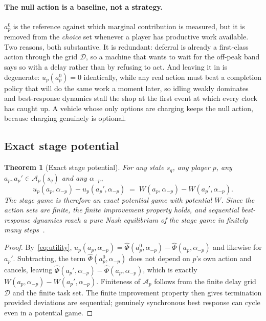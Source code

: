 \documentclass[preprint, 3p, review, 12pt]{elsarticle}
\newtheorem{theorem}{Theorem}
\theoremstyle{definition}
\begin{document}
\paragraph{The null action is a baseline, not a strategy.}
$a_p^{0}$ is the reference against which marginal contribution is measured, but it is removed
from the \emph{choice} set whenever a player has productive work available. Two reasons, both
substantive. It is redundant: deferral is already a first-class action through the grid
$\mathcal{D}$, so a machine that wants to wait for the off-peak band says so with a delay
rather than by refusing to act. And leaving it in is degenerate: $u_p(a_p^{0})=0$
identically, while any real action must beat a completion policy that will do the same work a
moment later, so idling weakly dominates and best-response dynamics stall the shop at the
first event at which every clock has caught up. A vehicle whose only options are charging
keeps the null action, because charging genuinely is optional.

\subsection{Exact stage potential}

\begin{theorem}[Exact stage potential]
\label{thm:t1}
For any state $s_q$, any player $p$, any $a_p,a_p'\in\mathcal{A}_p(s_q)$ and any
$\alpha_{-p}$,
\[
u_p(a_p,\alpha_{-p}) - u_p(a_p',\alpha_{-p}) \;=\; W(a_p,\alpha_{-p}) - W(a_p',\alpha_{-p}).
\]
The stage game is therefore an exact potential game with potential $W$. Since the action
sets are finite, the finite improvement property holds, and \emph{sequential} best-response
dynamics reach a pure Nash equilibrium of the stage game in finitely many
steps~\citep{monderer1996potential}.
\end{theorem}

\begin{proof}
By~\eqref{eq:utility}, $u_p(a_p,\alpha_{-p}) = \widehat{\Phi}(a_p^{0},\alpha_{-p}) -
\widehat{\Phi}(a_p,\alpha_{-p})$ and likewise for $a_p'$. Subtracting, the term
$\widehat{\Phi}(a_p^{0},\alpha_{-p})$ does not depend on $p$'s own action and cancels,
leaving $\widehat{\Phi}(a_p',\alpha_{-p})-\widehat{\Phi}(a_p,\alpha_{-p})$, which is exactly
$W(a_p,\alpha_{-p})-W(a_p',\alpha_{-p})$. Finiteness of $\mathcal{A}_p$ follows from the
finite delay grid $\mathcal{D}$ and the finite task set. The finite improvement property then
gives termination provided deviations are sequential; genuinely synchronous best response can
cycle even in a potential game.
\end{proof}
\end{document}
